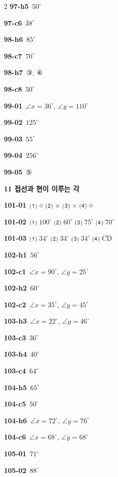 \documentclass[10pt,a4paper]{article}
\newcommand{\seg}[1]{\overline{\mathrm{#1}}}
\begin{document}
\begin{multicols}{2}
\noindent\textbf{97-h5}\ $50^\circ$\par
\noindent\textbf{97-c6}\ $38^\circ$\par
\noindent\textbf{98-h6}\ $85^\circ$\par
\noindent\textbf{98-c7}\ $70^\circ$\par
\noindent\textbf{98-h7}\ ③, ④\par
\noindent\textbf{98-c8}\ $50^\circ$\par
\noindent\textbf{99-01}\ $\angle x=36^\circ$, $\angle y=110^\circ$\par
\noindent\textbf{99-02}\ $125^\circ$\par
\noindent\textbf{99-03}\ $55^\circ$\par
\noindent\textbf{99-04}\ $256^\circ$\par
\noindent\textbf{99-05}\ ⑤\par
\noindent\textbf{11 접선과 현이 이루는 각}\par\smallskip
\noindent\textbf{101-01}\ ⑴ ○ ⑵ × ⑶ × ⑷ ○\par
\noindent\textbf{101-02}\ ⑴ $100^\circ$ ⑵ $60^\circ$ ⑶ $75^\circ$ ⑷ $70^\circ$\par
\noindent\textbf{101-03}\ ⑴ $34^\circ$ ⑵ $34^\circ$ ⑶ $34^\circ$ ⑷ $\seg{CD}$\par
\noindent\textbf{102-h1}\ $56^\circ$\par
\noindent\textbf{102-c1}\ $\angle x=90^\circ$, $\angle y=25^\circ$\par
\noindent\textbf{102-h2}\ $60^\circ$\par
\noindent\textbf{102-c2}\ $\angle x=35^\circ$, $\angle y=45^\circ$\par
\noindent\textbf{103-h3}\ $\angle x=22^\circ$, $\angle y=46^\circ$\par
\noindent\textbf{103-c3}\ $36^\circ$\par
\noindent\textbf{103-h4}\ $40^\circ$\par
\noindent\textbf{103-c4}\ $64^\circ$\par
\noindent\textbf{104-h5}\ $65^\circ$\par
\noindent\textbf{104-c5}\ $50^\circ$\par
\noindent\textbf{104-h6}\ $\angle x=72^\circ$, $\angle y=76^\circ$\par
\noindent\textbf{104-c6}\ $\angle x=68^\circ$, $\angle y=68^\circ$\par
\noindent\textbf{105-01}\ $71^\circ$\par
\noindent\textbf{105-02}\ $88^\circ$\par

\end{multicols}
\end{document}
